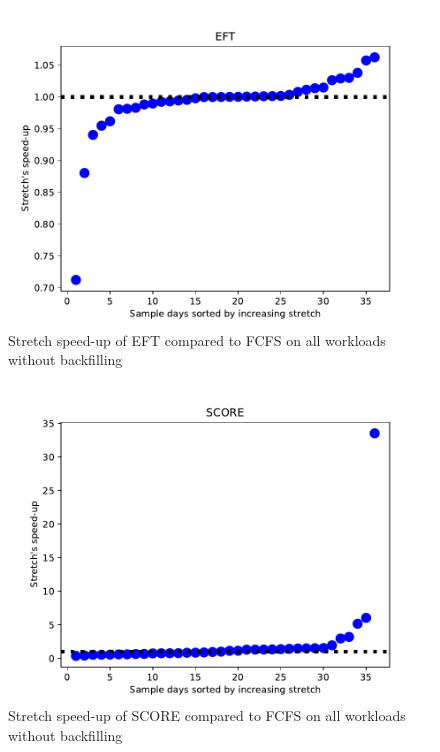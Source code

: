 \documentclass[conference,10pt]{IEEEtran}
\begin{document}
\begin{figure}\centering\includegraphics[width=1\linewidth]{../MBSS/plot/Scatter/scatter_mean_stretch_all_workloads_EFT.pdf}\caption{Stretch speed-up of EFT compared to FCFS on all workloads without backfilling}\end{figure}
\begin{figure}\centering\includegraphics[width=1\linewidth]{../MBSS/plot/Scatter/scatter_mean_stretch_all_workloads_SCORE.pdf}\caption{Stretch speed-up of SCORE compared to FCFS on all workloads without backfilling}\end{figure}
\end{document}

